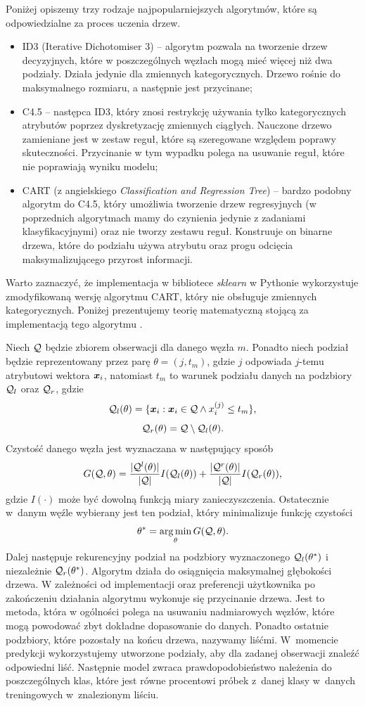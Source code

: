 \documentclass[inzynierska]{pwr_wmat_praca_dyplomowa}
\theoremstyle{plain}
\numberwithin{theorem}{chapter}
\theoremstyle{definition}
\numberwithin{theorem}{chapter}
\DeclareMathOperator*{\argmin}{arg\,min}
\begin{document}
Poniżej opiszemy trzy rodzaje najpopularniejszych algorytmów, które są odpowiedzialne za proces uczenia drzew.
\begin{itemize}
	\item ID3 (Iterative Dichotomiser 3) -- algorytm pozwala na tworzenie drzew decyzyjnych, które w poszczególnych węzłach mogą mieć więcej niż dwa podziały. Działa jedynie dla zmiennych kategorycznych. Drzewo rośnie do maksymalnego rozmiaru, a następnie jest przycinane;
	\item C4.5 -- następca ID3, który znosi restrykcję używania tylko kategorycznych atrybutów poprzez dyskretyzację zmiennych ciągłych. Nauczone drzewo zamieniane jest w zestaw reguł, które są szeregowane względem poprawy skuteczności. Przycinanie w tym wypadku polega na usuwanie reguł, które nie poprawiają wyniku modelu;
	\item CART (z angielskiego \textit{Classification and Regression Tree}) -- bardzo podobny algorytm do C4.5, który umożliwia tworzenie drzew regresyjnych (w poprzednich algorytmach mamy do czynienia jedynie z zadaniami klasyfikacyjnymi) oraz nie tworzy zestawu reguł. Konstruuje on binarne drzewa, które do podziału używa atrybutu oraz progu odcięcia maksymalizującego przyrost informacji.
\end{itemize}
Warto zaznaczyć, że implementacja w bibliotece \textit{sklearn} w Pythonie wykorzystuje zmodyfikowaną wersję algorytmu CART, który nie obsługuje zmiennych kategorycznych. Poniżej prezentujemy teorię matematyczną stojącą za implementacją tego algorytmu \cite{sklearn_api}.

Niech $\mathcal{Q}$ będzie zbiorem obserwacji dla danego węzła $m$. Ponadto niech podział będzie reprezentowany przez parę $\theta = (j, t_m)$, gdzie $j$ odpowiada $j$-temu atrybutowi wektora $\boldsymbol{x}_i$, natomiast $t_m$ to warunek podziału danych na podzbiory $\mathcal{Q}_l$ oraz $\mathcal{Q}_r$, gdzie
$$ \mathcal{Q}_l (\theta) = \{ \boldsymbol{x}_i : \boldsymbol{x}_i \in \mathcal{Q} \land x^{(j)}_i \leq t_m \} \text{,} $$
$$ \mathcal{Q}_r (\theta) = \mathcal{Q} \setminus \mathcal{Q}_l(\theta) \text{.} $$
Czystość danego węzła jest wyznaczana w następujący sposób
$$ G(\mathcal{Q}, \theta) = \frac{|\mathcal{Q}^l (\theta)|}{|\mathcal{Q}|} I(\mathcal{Q}_l (\theta)) + \frac{|\mathcal{Q}^r (\theta)|}{|\mathcal{Q}|} I(\mathcal{Q}_r (\theta)) \text{,}$$
gdzie $I(\cdot)$ może być dowolną funkcją miary zanieczyszczenia. Ostatecznie w~danym węźle wybierany jest ten podział, który minimalizuje funkcję czystości
$$ \theta^* = \argmin_\theta G(\ku, \theta) \text{.}$$
Dalej następuje rekurencyjny podział na podzbiory wyznaczonego $\mathcal{Q}_l (\theta^*)$ i niezależnie $\mathcal{Q}_r (\theta^*)$. Algorytm działa do osiągnięcia maksymalnej głębokości drzewa. W zależności od implementacji oraz preferencji użytkownika po zakończeniu działania algorytmu wykonuje się przycinanie drzewa. Jest to metoda, która w ogólności polega na usuwaniu nadmiarowych węzłów, które mogą powodować zbyt dokładne dopasowanie do danych. Ponadto ostatnie podzbiory, które pozostały na końcu drzewa, nazywamy liśćmi. 
W~momencie predykcji wykorzystujemy utworzone podziały, aby dla zadanej obserwacji znaleźć odpowiedni liść. Następnie model zwraca prawdopodobieństwo należenia do poszczególnych klas, które jest równe procentowi próbek z~danej klasy w~danych treningowych w~znalezionym liściu.
\end{document}
